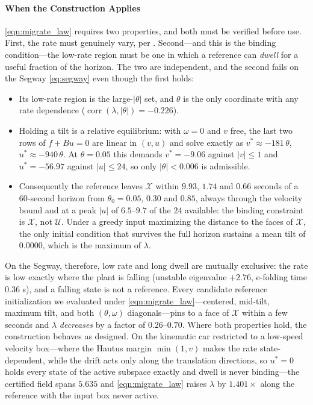 \documentclass[lettersize,journal]{IEEEtran}
\begin{document}
\paragraph{When the Construction Applies}
\eqref{eqn:migrate_law} requires two properties, and both must be verified
before use. First, the rate must genuinely vary, per
. Second---and this is the binding condition---the low-rate
region must be one in which a reference can \emph{dwell} for a useful fraction
of the horizon. The two are independent, and the second fails on the Segway
\eqref{eq:segway} even though the first holds:
\begin{itemize}
    \item Its low-rate region is the large-$\lvert\theta\rvert$ set, and $\theta$
    is the only coordinate with any rate dependence
    ($\operatorname{corr}(\lambda,\lvert\theta\rvert)=-0.226$).
    \item Holding a tilt is a relative equilibrium: with $\omega=0$ and $v$ free,
    the last two rows of $f+Bu=0$ are linear in $(v,u)$ and solve exactly as
    $v^*\approx-181\,\theta$, $u^*\approx-940\,\theta$. At $\theta=0.05$ this
    demands $v^*=-9.06$ against $\lvert v\rvert\le1$ and $u^*=-56.97$ against
    $\lvert u\rvert\le24$, so only $\lvert\theta\rvert<0.006$ is admissible.
    \item Consequently the reference leaves $\mathcal{X}$ within
    $9.93$, $1.74$ and $0.66$ seconds of a $60$-second horizon from
    $\theta_0=0.05$, $0.30$ and $0.85$, always through the velocity bound and at
    a peak $\lvert u\rvert$ of $6.5$--$9.7$ of the $24$ available: the binding
    constraint is $\mathcal{X}$, not $\mathcal{U}$. Under a greedy input
    maximizing the distance to the faces of $\mathcal{X}$, the only initial
    condition that survives the full horizon sustains a mean tilt of $0.0000$,
    which is the maximum of $\lambda$.
\end{itemize}
On the Segway, therefore, low rate and long dwell are mutually exclusive: the
rate is low exactly where the plant is falling (unstable eigenvalue $+2.76$,
e-folding time $0.36$ s), and a falling state is not a reference. Every
candidate reference initialization we evaluated under
\eqref{eqn:migrate_law}---centered, mid-tilt, maximum tilt, and both
$(\theta,\omega)$ diagonals---pins to a face of $\mathcal{X}$ within a few
seconds and $\lambda$ \emph{decreases} by a factor of $0.26$--$0.70$. Where both
properties hold, the construction behaves as designed. On the kinematic car
restricted to a low-speed velocity box---where the Hautus margin $\min(1,v)$
makes the rate state-dependent, while the drift acts only along the translation
directions, so $u^*=0$ holds every state of the active subspace exactly and
dwell is never binding---the certified field spans $5.635$ and
\eqref{eqn:migrate_law} raises $\lambda$ by $1.401\times$ along the reference
with the input box never active.
\end{document}

